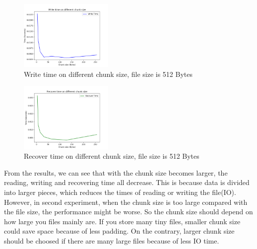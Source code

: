 \documentclass[journal]{IEEEtran}
\begin{document}
\begin{figure}[H]

	\centering

	\captionsetup{justification=centering}

	\includegraphics[width=0.4\textwidth]{fig/result_write_small.png}

	\caption{Write time on different chunk size, file size is 512 Bytes}

\end{figure}


\begin{figure}[H]

	\centering

	\captionsetup{justification=centering}

	\includegraphics[width=0.4\textwidth]{fig/result_recover_small.png}

	\caption{Recover time on different chunk size, file size is 512 Bytes}

\end{figure}


From the results, we can see that with the chunk size becomes larger, the reading, writing and recovering time all decrease. This is because data is divided into larger pieces, which reduces the times of reading or writing the file(IO). However, in second experiment, when the chunk size is too large compared with the file size, the performance might be worse. So the chunk size should depend on how large you files mainly are. If you store many tiny files, smaller chunk size could save space because of less padding. On the contrary, larger chunk size should be choosed if there are many large files because of less IO time.
\end{document}
